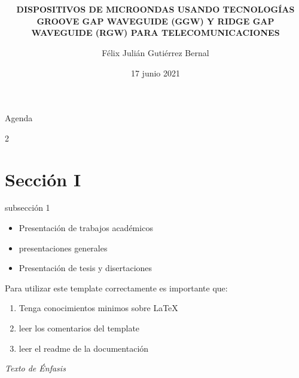 \documentclass{libs/ufc_format}
\title[GGW, RGW]{\huge\textbf{}}
\subtitle{\textbf{DISPOSITIVOS DE MICROONDAS USANDO TECNOLOGÍAS GROOVE GAP WAVEGUIDE (GGW) Y RIDGE GAP WAVEGUIDE (RGW) PARA TELECOMUNICACIONES}}
\author{Félix Julián Gutiérrez Bernal}
\institute[UNAL]{
    \normalsize{\email{fjgutierrezb@unal.edu.co}}
    \newline
    \department{Doctorado en ingeniería Eléctrica}
    \newline
    \ufc
}
\date{17 junio 2021}
\begin{document}


\begin{frame}{}
    \maketitle
\end{frame}

\begin{frame}{Agenda}
    \begin{multicols}{2}
        \tableofcontents
    \end{multicols}
\end{frame}

\section{Sección I}
\begin{frame}{subsección 1}
      \begin{itemize}
        \item Presentación de trabajos académicos
        \item presentaciones generales
        \item Presentación de tesis y disertaciones
    \end{itemize}

    \vspace{0.4cm} %
    
    Para utilizar este template correctamente es importante que:
    \begin{enumerate}
        \item Tenga conocimientos minimos sobre LaTeX
        \item leer los comentarios del template
        \item leer el readme de la documentación
    \end{enumerate}

    \vspace{0.2cm}

     \emph{Texto de Énfasis}
\end{frame}
\end{document}
